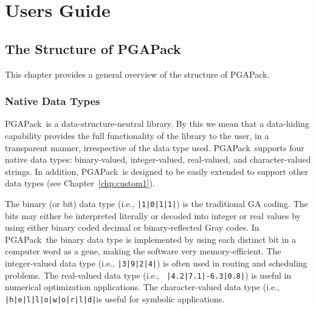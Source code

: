 \documentclass{report}
\newcommand{\pga}{PGAPack}
\begin{document}
\part{Users Guide}\label{part:userguide}


\chapter{The Structure of \pga}\label{chp:structure}

This chapter provides a general overview of the structure of
\pga.

\section{Native Data Types}\label{sec:data-structure}

\pga\ is a data-structure-neutral library.  By this we mean that a data-hiding
capability provides the full functionality of the library to the user, in a
transparent manner, irrespective of the data type used.  \pga\ supports four
native data types: binary-valued, integer-valued, real-valued, and
character-valued strings.  In addition, \pga\ is designed to be easily
extended to support other data types (see Chapter~\ref{chp:custom1}).

The binary (or bit) data type (i.e., {\tt |1|0|1|1|}) is the traditional GA
coding.  The bits may either be interpreted literally or decoded into integer
or real values by using either binary coded decimal or binary-reflected Gray
codes.  In \pga\ the binary data type is implemented by using each distinct
bit in a computer word as a gene, making the software very memory-efficient.
The integer-valued data type (i.e., {\tt |3|9|2|4|}) is often used in routing
and scheduling problems.  The real-valued data type (i.e., {\tt
|4.2|7.1|-6.3|0.8|}) is useful in numerical optimization applications.  The
character-valued data type (i.e., {\tt |h|e|l|l|o|w|o|r|l|d|}is useful for
symbolic applications.
\end{document}
